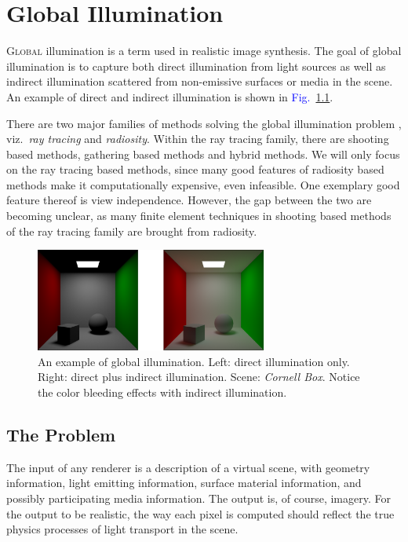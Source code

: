 \documentclass[]{book}
\renewcommand{\figurename}{\textcolor{blue}{Fig.\ }}
\begin{document}

\chapter{Global Illumination}
\label{chap:GI}
\lettrine{G}{lobal} illumination is a term used in realistic image synthesis.
The goal of global illumination is to capture both direct illumination from light sources as well as indirect illumination scattered from non-emissive surfaces or media in the scene.
An example of direct and indirect illumination is shown in \figurename \ref{fig:GI:directVSindir}.

There are two major families of methods solving the global illumination problem \cite{AdvancedGI}, viz.\ \textit{ray tracing} and \textit{radiosity}.
Within the ray tracing family, there are shooting based methods, gathering based methods and hybrid methods.
We will only focus on the ray tracing based methods, since many good features of radiosity based methods make it computationally expensive, even infeasible.
One exemplary good feature thereof is view independence.
However, the gap between the two are becoming unclear, as many finite element techniques in shooting based methods of the ray tracing family are brought from radiosity.

\begin{figure}
	\centering
	\includegraphics[width=3.0in]{img/GI-directAndIndirect.png}
	\caption[A global illumination example]{An example of global illumination. Left: direct illumination only. Right: direct plus indirect illumination. Scene: \textit{Cornell Box}. Notice the color bleeding effects with indirect illumination.}
	\label{fig:GI:directVSindir}
\end{figure}

\section{The Problem}
\label{sec:GI:problem}
The input of any renderer is a description of a virtual scene, with geometry information, light emitting information, surface material information, and possibly participating media information.
The output is, of course, imagery.
For the output to be realistic, the way each pixel is computed should reflect the true physics processes of light transport in the scene.
\end{document}
